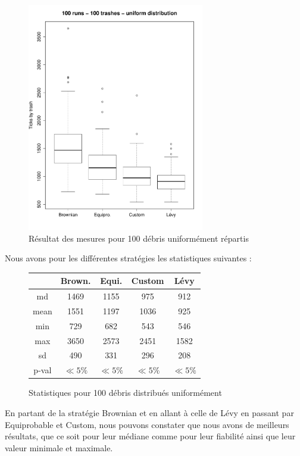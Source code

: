 
\begin{figure}[H]
	\begin{center}
		\includegraphics[height=10cm]{diagrams/100TrRnd_all.pdf}
		\caption{Résultat des mesures pour 100 débris uniformément répartis}
		\label{fig:100Trashes_Rnd}
	\end{center}
\end{figure}
Nous avons pour les différentes stratégies les statistiques suivantes :
\begin{figure}[H]
	\begin{center}
		\begin{tabular}{| c || c | c | c | c | }
			\hline
			&Brown.&Equi.&Custom&Lévy \\
			\hline
			\hline
			md&1469&1155&975&912\\
			mean&1551&1197&1036&925\\
			min & 729 & 682 & 543 & 546 \\
			max & 3650 & 2573 & 2451 & 1582 \\
			sd&490&331&296&208\\
			p-val&$\ll 5\%$&$\ll 5\%$&$\ll 5\%$&$\ll 5\%$\\
			\hline
		\end{tabular}
		\caption{Statistiques pour 100 débris distribués uniformément}
	\end{center}
\end{figure}

En partant de la stratégie Brownian et en allant à celle de Lévy
en passant par Equiprobable et Custom, nous pouvons constater
que nous avons de meilleurs résultats, que ce soit pour leur médiane
comme pour leur fiabilité ainsi que leur valeur minimale et maximale.
